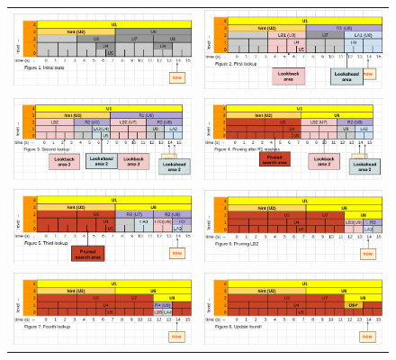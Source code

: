 \begin{figure}[htbp]
\centering
\begin{tabular}{c|c}
\includegraphics[width=.5\textwidth]{fig/feeds/0.png}&\includegraphics[width=.5\textwidth]{fig/feeds/1.png}\\
\includegraphics[width=.5\textwidth]{fig/feeds/2.png}&\includegraphics[width=.5\textwidth]{fig/feeds/3.png}\\
\includegraphics[width=.5\textwidth]{fig/feeds/4.png}&\includegraphics[width=.5\textwidth]{fig/feeds/5.png}\\
\includegraphics[width=.5\textwidth]{fig/feeds/6.png}&\includegraphics[width=.5\textwidth]{fig/feeds/7.png}

\end{tabular}
\end{figure}
